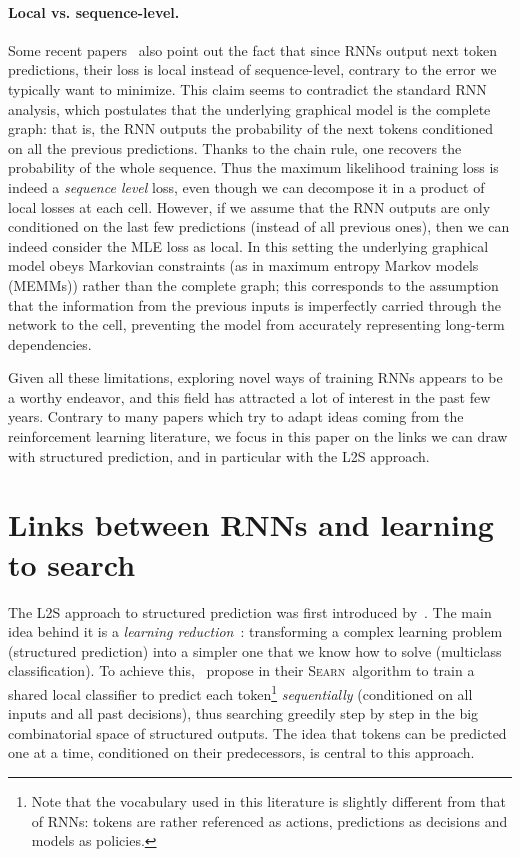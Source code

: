 \documentclass{article}
\newcommand{\SEARN}{\textsc{Searn}}
\begin{document}
	\paragraph{Local vs. sequence-level.}
	Some recent papers~\citep{Ranzato2016b, Wiseman2016b} also point out the fact that since RNNs output next token predictions, their loss is local instead of sequence-level, contrary to the error we typically want to minimize.
	This claim seems to contradict the standard RNN analysis, which postulates that the underlying graphical model is the complete graph: that is, the RNN outputs the probability of the next tokens conditioned on all the previous predictions.
	Thanks to the chain rule, one recovers the probability of the whole sequence.
	Thus the maximum likelihood training loss is indeed a \textit{sequence level} loss, even though we can decompose it in a product of local losses at each cell.
	However, if we assume that the RNN outputs are only conditioned on the last few predictions (instead of all previous ones), then we can indeed consider the MLE loss as local.
	In this setting the underlying graphical model obeys Markovian constraints (as in maximum entropy Markov models (MEMMs)) rather than the complete graph; this corresponds to the assumption that the information from the previous inputs is imperfectly carried through the network to the cell, preventing the model from accurately representing long-term dependencies.


	Given all these limitations, exploring novel ways of training RNNs appears to be a worthy endeavor, and this field has attracted a lot of interest in the past few years.
	Contrary to many papers which try to adapt ideas coming from the reinforcement learning literature, we focus in this paper on the links we can draw with structured prediction, and in particular with the L2S approach.

	\vspace{-1mm}
	\section{Links between RNNs and learning to search}\label{sec:L2S}
	\vspace{-1mm}
	The L2S approach to structured prediction was first introduced by~\citet{Daume2009b}.
	The main idea behind it is a \textit{learning reduction}~\citep{beygelzimer2016learning}: transforming a complex learning problem (structured prediction) into a simpler one that we know how to solve (multiclass classification).
	To achieve this,~\citet{Daume2009b} propose in their \SEARN\ algorithm to train a shared local classifier to predict each token\footnote{Note that the vocabulary used in this literature is slightly different from that of RNNs: tokens are rather referenced as actions, predictions as decisions and models as policies. } \emph{sequentially} (conditioned on all inputs and all past decisions), thus searching greedily step by step in the big combinatorial space of structured outputs.
	The idea that tokens can be predicted one at a time, conditioned on their predecessors, is central to this approach.
\end{document}
